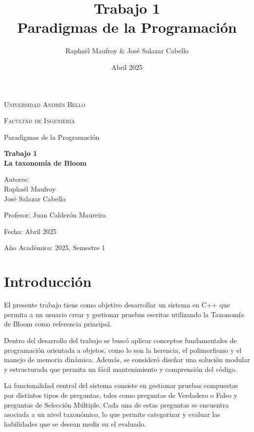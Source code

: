 \documentclass[12pt]{article}
\title{Trabajo 1\\ Paradigmas de la Programación}
\author{Raphaël Maufroy \& José Salazar Cabello}
\date{Abril 2025}
\begin{document}
\begin{titlepage}
    \centering
    \vspace*{2cm}
    {\scshape\LARGE Universidad Andrés Bello \par}
    \vspace{1cm}
    {\scshape\Large Facultad de Ingeniería\par}
    \vspace{1.5cm}
    {\Large Paradigmas de la Programación\par}
    \vspace{0.5cm}
    {\huge\bfseries Trabajo 1\\La taxonomía de Bloom \par}
    \vspace{2cm}
    {\Large Autores: \\Raphaël Maufroy\\José Salazar Cabello\par}
    \vspace{0.5cm}
    {\Large Profesor: Juan Calderón Maureira\par}
    \vspace{0.5cm}
    {\Large Fecha: Abril 2025\par}
    \vfill
    {\large Año Académico: 2025, Semestre 1\par}
\end{titlepage}

\section{Introducción}
El presente trabajo tiene como objetivo desarrollar un sistema en C++ que permita a un usuario crear y gestionar pruebas escritas utilizando la Taxonomía de Bloom como referencia principal.

Dentro del desarrollo del trabajo se buscó aplicar conceptos fundamentales de programación orientada a objetos, como lo son la herencia, el polimorfismo y el manejo de memoria dinámica. Además, se consideró diseñar una solución modular y estructurada que permita un fácil mantenimiento y comprensión del código.

La funcionalidad central del sistema consiste en gestionar pruebas compuestas por distintos tipos de preguntas, tales como preguntas de Verdadero o Falso y preguntas de Selección Múltiple. Cada una de estas preguntas se encuentra asociada a un nivel taxonómico, lo que permite categorizar y evaluar las habilidades que se desean medir en el evaluado.
\end{document}
